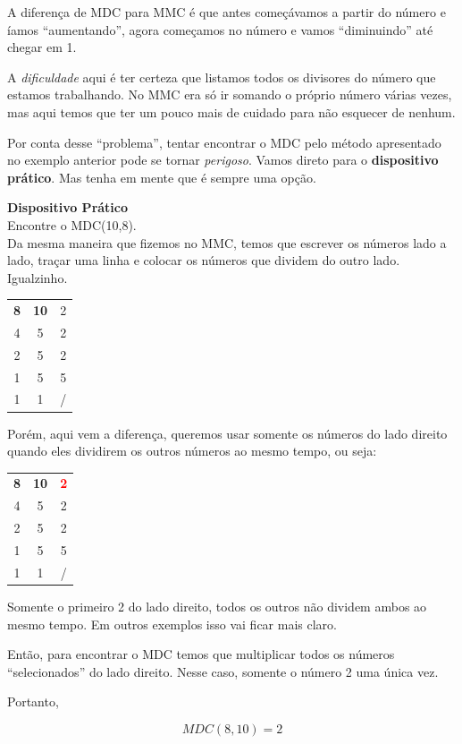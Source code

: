 A diferença de MDC para MMC é que antes começávamos a partir do número e íamos ``aumentando'', agora começamos no número e vamos ``diminuindo'' até chegar em 1.

A \textit{dificuldade} aqui é ter certeza que listamos todos os divisores do número que estamos trabalhando. No MMC era só ir somando o próprio número várias vezes, mas aqui temos que ter um pouco mais de cuidado para não esquecer de nenhum.

Por conta desse ``problema'', tentar encontrar o MDC pelo método apresentado no exemplo anterior pode se tornar \textit{perigoso}. Vamos direto para o \textbf{dispositivo prático}. Mas tenha em mente que é sempre uma opção.

\begin{exemplo}
    \textbf{Dispositivo Prático}\\

    Encontre o MDC(10,8).\\

    Da mesma maneira que fizemos no MMC, temos que escrever os números lado a lado, traçar uma linha e colocar os números que dividem do outro lado. Igualzinho.

    \begin{table}[H]
    \centering
    \begin{tabular}{cc|c}
        \textbf{8} & \textbf{10} & 2\\
        4 & 5 & 2\\
        2 & 5 & 2\\
        1 & 5 & 5\\
        1 & 1 & /\\
    \end{tabular}
    \end{table}

    Porém, aqui vem a diferença, queremos usar somente os números do lado direito quando eles dividirem os outros números ao mesmo tempo, ou seja:

    \begin{table}[H]
    \centering
    \begin{tabular}{cc|c}
        \textbf{8} & \textbf{10} & \textbf{\textcolor{red}{2}}\\
        4 & 5 & 2\\
        2 & 5 & 2\\
        1 & 5 & 5\\
        1 & 1 & /\\
    \end{tabular}
    \end{table}

    Somente o primeiro 2 do lado direito, todos os outros não dividem ambos ao mesmo tempo. Em outros exemplos isso vai ficar mais claro. 

    Então, para encontrar o MDC temos que multiplicar todos os números ``selecionados'' do lado direito. Nesse caso, somente o número 2 uma única vez.

    Portanto,

    \begin{equation}
        MDC(8,10)=2
    \end{equation}
\end{exemplo}

